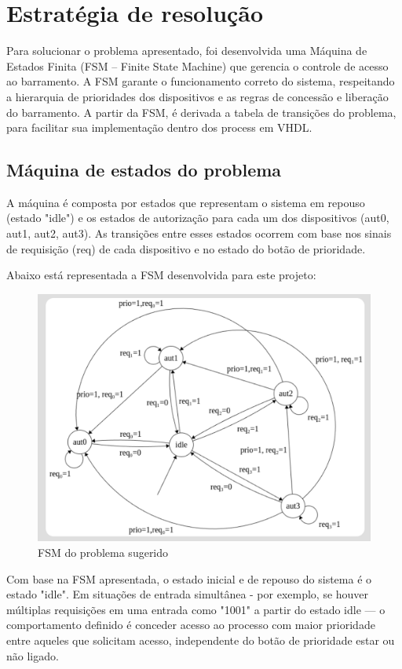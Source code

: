 \documentclass[oneside]{uffstex}
\begin{document}
\chapter{Estratégia de resolução}
Para solucionar o problema apresentado, foi desenvolvida uma Máquina de Estados Finita (FSM – Finite State Machine) que gerencia o controle de acesso ao barramento. A FSM garante o funcionamento correto do sistema, respeitando a hierarquia de prioridades dos dispositivos e as regras de concessão e liberação do barramento. A partir da FSM, é derivada a tabela de transições do problema, para facilitar sua implementação dentro dos process em VHDL.

\section{Máquina de estados do problema}
A máquina é composta por estados que representam o sistema em repouso (estado "idle") e os estados de autorização para cada um dos dispositivos (aut0, aut1, aut2, aut3). As transições entre esses estados ocorrem com base nos sinais de requisição (req) de cada dispositivo e no estado do botão de prioridade.

Abaixo está representada a FSM desenvolvida para este projeto:
\begin{figure}[H]
    \centering
    \includegraphics[width=0.9\linewidth]{morte.png}
    \caption{FSM do problema sugerido}
    \label{fig:FSM}
\end{figure}
Com base na FSM apresentada, o estado inicial e de repouso do sistema é o estado "idle". Em situações de entrada simultânea - por exemplo, se houver múltiplas requisições em uma entrada como "1001" a partir do estado idle — o comportamento definido é conceder acesso ao processo com maior prioridade entre aqueles que solicitam acesso, independente do botão de prioridade estar ou não ligado.
\end{document}
